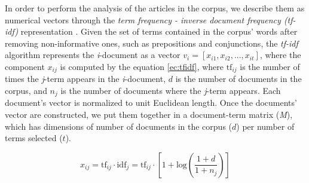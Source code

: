 \documentclass[10pt,letterpaper]{article}
\begin{document}
\par In order to perform the analysis of the articles in the corpus, we describe them as numerical vectors through the \textit{term frequency - inverse document frequency (tf-idf)} representation \cite{xu2003document}. Given the set of terms contained in the corpus' words after removing non-informative ones, such as prepositions and conjunctions, the \textit{tf-idf} algorithm represents the \textit{i}-document as a vector $v_i = [x_{i1}, x_{i2}, ... , x_{it}]$, where the component $x_{ij}$ is computed by the equation \ref{ec:tfidf}, where $\textrm{tf}_{ij}$ is the number of times the \textit{j}-term appears in the \textit{i}-document, $d$ is the number of documents in the corpus, and $n_j$ is the number of documents where the \textit{j}-term appears. Each document's vector is normalized to unit Euclidean length. Once the documents' vector are constructed, we put them together in a document-term matrix (\emph{M}), which has dimensions of number of documents in the corpus ($d$) per number of terms selected ($t$).

\begin{equation}
x_{ij} = \textrm{tf}_{ij} \cdot \textrm{idf}_{j} = \textrm{tf}_{ij} \cdot [1 + \textrm{log}(\frac{1 + d}{1 + n_j})] 
\label{ec:tfidf}
\end{equation}
\end{document}
